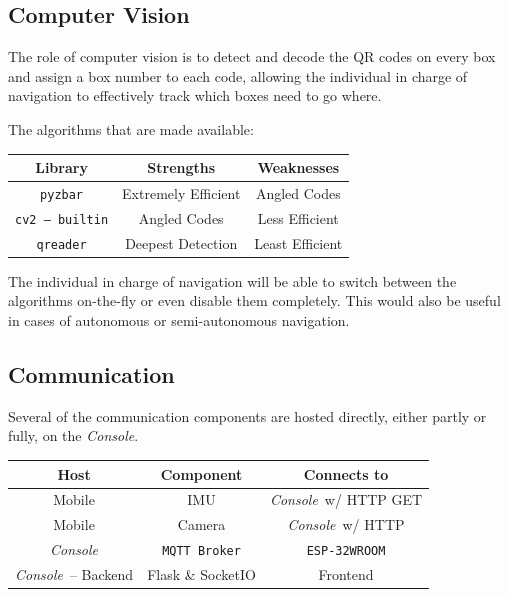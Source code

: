 \documentclass[a4paper,12pt]{article}
\newcommand{\esp}{\texttt{ESP-32WROOM}}
\newcommand{\con}{\textit{Console}}
\begin{document}
\subsection{Computer Vision}
The role of computer vision is to detect and decode the QR codes on every box and assign a box number to each code, allowing the individual in charge of navigation to effectively track which boxes need to go where.

The algorithms that are made available:
\begin{center}
    \bgroup
    \def\arraystretch{1.5}
    {
    \begin{tabular}{|c|c|c|}
        \hline
        \textbf{Library} & \textbf{Strengths} & \textbf{Weaknesses} \\
        \hline
        \texttt{pyzbar} & Extremely Efficient & Angled Codes \\
        \hline
        \texttt{cv2 -- builtin} & Angled Codes & Less Efficient \\
        \hline
        \texttt{qreader} & Deepest Detection & Least Efficient \\
        \hline
    \end{tabular}}
    \egroup
\end{center}
The individual in charge of navigation will be able to switch between the algorithms on-the-fly or even disable them completely. This would also be useful in cases of autonomous or semi-autonomous navigation.
\subsection{Communication}
Several of the communication components are hosted directly, either partly or fully, on the \con.
\begin{center}
    \bgroup
    \def\arraystretch{1.5}
    {
    \begin{tabular}{|c|c|c|}
        \hline
        \textbf{Host} & \textbf{Component} & \textbf{Connects to} \\
        \hline
        Mobile & IMU & \con\ w/ HTTP GET \\
        \hline
        Mobile & Camera & \con\ w/ HTTP \\
        \hline
        \con & \texttt{MQTT Broker} & \esp \\
        \hline
        \con\ -- Backend & Flask \& SocketIO & Frontend \\
        \hline
    \end{tabular}}
    \egroup
\end{center}
\end{document}
